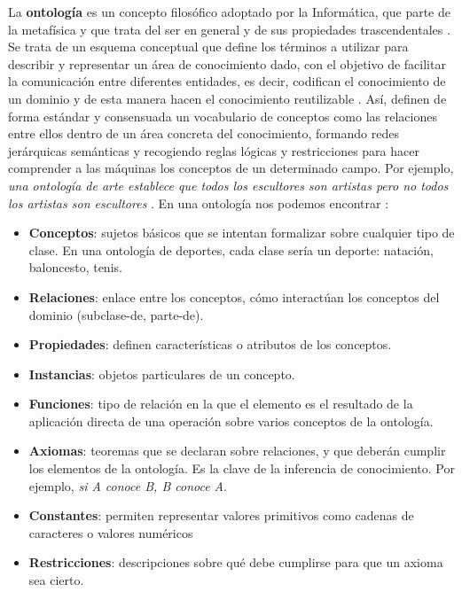 La \textbf{ontología} es un concepto filosófico adoptado por la Informática, que parte de la metafísica y que trata del ser en general y de sus propiedades trascendentales \cite{apuntes-clase-jose}. Se trata de un esquema conceptual que define los términos a utilizar para describir y representar un área de conocimiento dado, con el objetivo de facilitar la comunicación entre diferentes entidades, es decir, codifican el conocimiento de un dominio y de esta manera hacen el conocimiento reutilizable \cite{tesis}. Así, definen de forma estándar y consensuada un vocabulario de conceptos como las relaciones entre ellos dentro de un área concreta del conocimiento, formando redes jerárquicas semánticas y recogiendo reglas lógicas y restricciones para hacer comprender a las máquinas los conceptos de un determinado campo. Por ejemplo, \textit{una ontología de arte establece que todos los escultores son artistas pero no todos los artistas son escultores} \cite{web-semantica-w3c}. En una ontología nos podemos encontrar \cite{aplicacion, apuntes-clase-jose}:

\begin{itemize}
	\item \textbf{Conceptos}: sujetos básicos que se intentan formalizar sobre cualquier tipo de clase. En una ontología de deportes, cada clase sería un deporte: natación, baloncesto, tenis.
	
	\item  \textbf{Relaciones}: enlace entre los conceptos, cómo interactúan los conceptos del dominio (subclase-de, parte-de).
	
	\item \textbf{Propiedades}: definen características o atributos de los conceptos.
	
	\item \textbf{Instancias}: objetos particulares de un concepto.
		
	\item \textbf{Funciones}: tipo de relación en la que el elemento es el resultado de la aplicación directa de una operación sobre varios conceptos de la ontología.
		
	\item \textbf{Axiomas}: teoremas que se declaran sobre relaciones, y que deberán cumplir los elementos de la ontología. Es la clave de la inferencia de conocimiento. Por ejemplo, \textit{si A conoce B, B conoce A}.
	
	\item \textbf{Constantes}: permiten representar valores primitivos como cadenas de caracteres o valores numéricos
	
	\item \textbf{Restricciones}: descripciones sobre qué debe cumplirse para que un axioma sea cierto.
	
\end{itemize}

